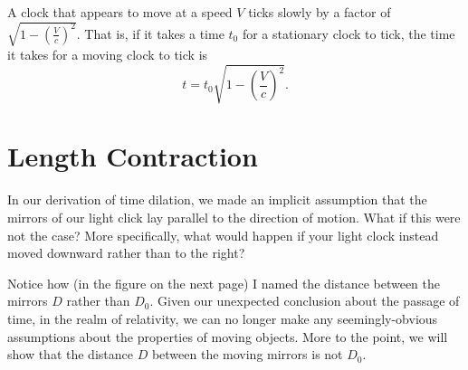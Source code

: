 \documentclass[../p023main.tex]{subfiles}
\begin{document}
\begin{summary}
    A clock that appears to move at a speed $V$ ticks slowly by a factor of $\sqrt{1 - \left( \frac{V}{c} \right)^2}$.
    That is, if it takes a time $t_0$ for a stationary clock to tick, the time it takes for a moving clock to tick is
    \[ t = t_0 \sqrt{1 - \left( \frac{V}{c} \right)^2}. \]
\end{summary}

\section{Length Contraction}
In our derivation of time dilation, we made an implicit assumption that the mirrors of our light click lay parallel to the direction of motion.
What if this were not the case?
More specifically, what would happen if your light clock instead moved downward rather than to the right?

Notice how (in the figure on the next page) I named the distance between the mirrors $D$ rather than $D_0$.
Given our unexpected conclusion about the passage of time, in the realm of relativity, we can no longer make any seemingly-obvious assumptions about the properties of moving objects.
More to the point, we will show that the distance $D$ between the moving mirrors is not $D_0$.
\end{document}
